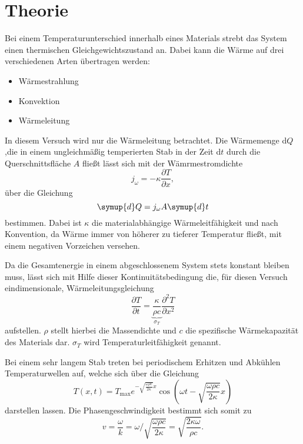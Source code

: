 \section{Theorie}
\label{sec:Theorie}

Bei einem Temperaturunterschied innerhalb eines Materials strebt das System einen thermischen Gleichgewichtszustand an.
Dabei kann die Wärme auf drei verschiedenen Arten übertragen werden:
\begin{itemize}
    \item Wärmestrahlung
    \item Konvektion
    \item Wärmeleitung
\end{itemize}

In diesem Versuch wird  nur die Wärmeleitung betrachtet. 
Die Wärmemenge d$Q$,die in einem ungleichmäßig temperierten Stab in der Zeit d$t$ durch die Querschnittsfläche $A$ fließt lässt sich mit der Wämrmestromdichte 
\begin{equation}
    j_{\omega}=-\kappa \frac{\partial T}{\partial x},
\end{equation}
über die Gleichung
\begin{equation}
    \symup{d}Q=j_{\omega}A\symup{d}t
\end{equation}
bestimmen.
Dabei ist $\kappa$ die materialabhängige Wärmeleitfähigkeit und nach Konvention, da Wärme immer von höherer zu tieferer Temperatur fließt, mit einem negativen Vorzeichen versehen.


Da die Gesamtenergie in einem abgeschlossenem System stets konstant bleiben muss, lässt sich mit Hilfe dieser Kontinuitätsbedingung die, für diesen Versuch eindimensionale, Wärmeleitungsgleichung  
\begin{equation}
        \frac{\partial T}{\partial t}=\underbrace{\frac{\kappa}{\rho c}}_{\sigma_T}\frac{\partial^2 T}{\partial x^2}
\end{equation}
aufstellen.
$\rho$ stellt hierbei die Massendichte und $c$ die spezifische Wärmekapazität des Materials dar.
$\sigma_T$ wird Temperaturleitfähigkeit genannt. 

Bei einem sehr langem Stab treten bei periodischem Erhitzen und Abkühlen Temperaturwellen auf, welche sich über die Gleichung
\begin{equation}
    T(x,t)=T_{\text{max}}e^{-\sqrt{\frac{\omega \rho c}{2 \kappa}}x}\cos \left(\omega t-\sqrt{\frac{\omega \rho c}{2 \kappa}}x\right)
\end{equation}
darstellen lassen.
Die Phasengeschwindigkeit bestimmt sich somit zu
\begin{equation}
    v=\frac{\omega}{k}=\omega / \sqrt{\frac{\omega \rho c}{2 \kappa}}=\sqrt{\frac{2 \kappa \omega}{\rho c}}.
\end{equation}

